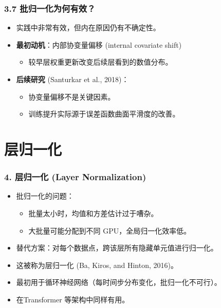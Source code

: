 \documentclass[t,aspectratio=169]{beamer} %
\begin{document}
\begin{frame}
    \frametitle{3.7 批归一化为何有效？}
    \begin{itemize}
        \item 实践中非常有效，但\alert{内在原因仍有不确定性}。
        \item \textbf{最初动机}：内部协变量偏移 (internal covariate shift)
        \begin{itemize}
            \item 较早层权重更新改变后续层看到的数值分布。
        \end{itemize}
        \item \textbf{后续研究} (Santurkar et al., 2018)：
        \begin{itemize}
            \item 协变量偏移\alert{不是关键因素}。
            \item 训练提升实际源于\alert{误差函数曲面平滑度的改善}。
        \end{itemize}
    \end{itemize}
\end{frame}

\section{层归一化}

\begin{frame}
    \frametitle{4. 层归一化 (Layer Normalization)}
    \begin{itemize}
        \item 批归一化的\alert{问题}：
        \begin{itemize}
            \item 批量太小时，均值和方差估计\alert{过于嘈杂}。
            \item 大批量可能分配到不同 GPU，全局归一化\alert{效率低}。
        \end{itemize}
        \item \alert{替代方案}：对每个数据点，跨该层所有隐藏单元值进行归一化。
        \item 这被称为\alert{层归一化} (Ba, Kiros, and Hinton, 2016)。
        \item 最初用于\alert{循环神经网络}（每时间步分布变化，批归一化不可行）。
        \item 在\alert{Transformer} 等架构中同样有用。
    \end{itemize}
\end{frame}
\end{document}
